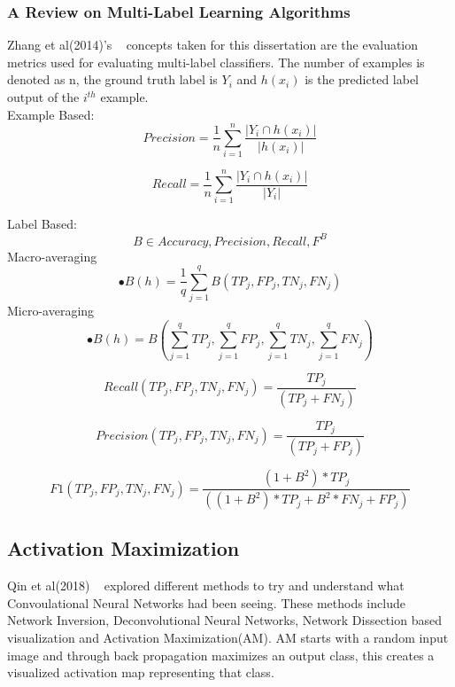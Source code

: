 \documentclass{IEEEtran}
\begin{document}
\subsubsection{A Review on Multi-Label Learning Algorithms}
Zhang et al(2014)'s ~\cite{6471714} concepts taken for this dissertation are the evaluation metrics used for evaluating multi-label classifiers. The number of examples is denoted as n, the ground truth label is $Y_{i}$ and $h(x_{i})$ is the predicted label output of the $i^{th}$ example.
\\
\small 
Example Based:
\begin{equation}
Precision = \frac{1}{n}\sum_{i=1}^{n}\frac{|Y_{i}\cap h(x_{i})|}{|h(x_{i})|}
\end{equation}

\begin{equation}
Recall = \frac{1}{n}\sum_{i=1}^{n}\frac{|Y_{i}\cap h(x_{i})|}{|Y_{i}|}
\end{equation}

Label Based:
\begin{equation}
B \in { Accuracy, Precision, Recall, F^B} 
\end{equation}
Macro-averaging
\begin{equation}
•B(h) = \frac{1}{q}\sum_{j=1}^{q} B(TP_j,FP_j,TN_j,FN_j)
\end{equation}
Micro-averaging
\begin{equation}
•B(h) = B(\sum_{j=1}^{q} TP_j,\sum_{j=1}^{q} FP_j,\sum_{j=1}^{q} TN_j,\sum_{j=1}^{q} FN_j)
\end{equation}

\begin{equation}
Recall(TP_j,FP_j,TN_j,FN_j) = \frac{TP_j}{(TP_j + FN_j)}
\end{equation}

\begin{equation}
Precision(TP_j,FP_j,TN_j,FN_j) = \frac{TP_j}{(TP_j + FP_j)}
\end{equation}

\begin{equation}
F1(TP_j,FP_j,TN_j,FN_j) = \frac{(1+B^2)*TP_j}{((1+B^2)*TP_j+B^2*FN_j+FP_j)}
\end{equation}
\normalsize
\subsection{Activation Maximization}
Qin et al(2018) ~\cite{AM} explored different methods to try and understand what Convoulational Neural Networks had been seeing. These methods include Network Inversion, Deconvolutional Neural Networks, Network Dissection based visualization and Activation Maximization(AM). AM starts with a random input image and through back propagation maximizes an output class, this creates a visualized activation map representing that class.
\end{document}
